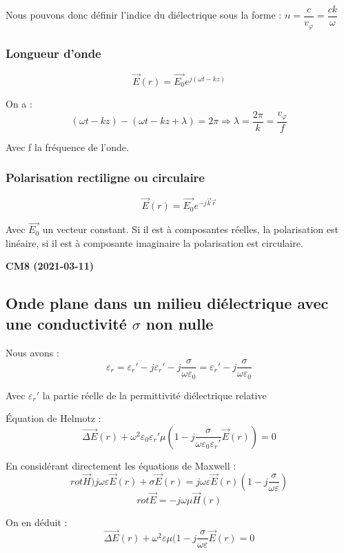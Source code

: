 \documentclass[12pt,a4paper]{report}
\begin{document}
Nous pouvons donc définir l'indice du diélectrique sous la forme : \(n = \dfrac{c}{v_\varphi} = \dfrac{ck}{\omega}\)

\subsubsection{Longueur d'onde}

\[
	\vec{E}(r) = \vec{E_0} e^{j(\omega t - k z)}
\]

On a : 
\[
	(\omega t - k z) - (\omega t - k z + \lambda) = 2\pi \Rightarrow \lambda = \dfrac{2\pi}{k} = \dfrac{v_\varphi}{f}
\]

Avec f la fréquence de l'onde.

\subsubsection{Polarisation rectiligne ou circulaire}

\[
	\vec{E}(r) = \vec{E_0} e^{-j \vec{k} \vec{r}}
\]

Avec \(\vec{E_0}\) un vecteur constant. Si il est à composantes réelles, la polarisation est linéaire, si il est à composante imaginaire la polarisation est circulaire.

\begin{center}
\textbf{CM8 (2021-03-11)}
\end{center}


\subsection{Onde plane dans un milieu diélectrique avec une conductivité \(\sigma\) non nulle}

Nous avons : 
\[
	\varepsilon_r = \varepsilon_r' - j\varepsilon_r' - j \dfrac{\sigma}{\omega \varepsilon_0} = \varepsilon_r' - j \dfrac{\sigma}{\omega \varepsilon_0}
\]

Avec \(\varepsilon_r'\) la partie réelle de la permittivité diélectrique relative

Équation de Helmotz :
\[
	\vec{\Delta E} (r) + \omega^2 \varepsilon_0 \varepsilon_r' \mu (1 - j\dfrac{\sigma}{\omega \varepsilon_0 \varepsilon_r'} \vec{E}(r)) = 0
\]

En considérant directement les équations de Maxwell :
\[
	rot\vec{H} ) j\omega \varepsilon \vec{E}(r) + \sigma \vec{E}(r) = j\omega \varepsilon \vec{E}(r) (1- j\dfrac{\sigma}{\omega \varepsilon})
\]
\[
	rot\vec{E} = -j\omega\mu \vec{H}(r)
\]

On en déduit :
\[
	\vec{\Delta E} (r) + \omega^2 \varepsilon \mu (1 - j\dfrac{\sigma}{\omega \varepsilon} \vec{E}(r) = 0
\]
\end{document}
